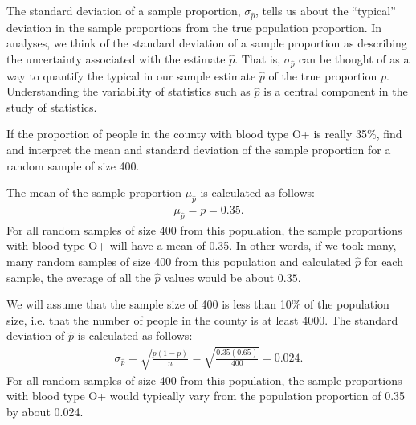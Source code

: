 The standard deviation of a sample proportion, $\sigma_{\hat{p}}$, tells us about the ``typical'' deviation in the sample proportions from the true population proportion.  In analyses, we think of the standard deviation of a sample proportion as describing the uncertainty associated with the estimate $\hat{p}$. That is, $\sigma_{\hat{p}}$ can be thought of as a way to quantify the typical  in our sample estimate $\hat{p}$ of the true proportion $p$. Understanding the variability of statistics such as $\hat{p}$ is a central component in the study of statistics.


\D{\newpage}

\begin{examplewrap}
\begin{nexample}{If the proportion of people in the county with blood type O+ is really 35\%, find and interpret the mean and standard deviation of the sample proportion for a random sample of size 400.}

The mean of the sample proportion $\mu_{\hat{p}}$ is calculated as follows:
\begin{align*}
\mu_{\hat{p}} = p = 0.35.
\end{align*}
For all random samples of size 400 from this population, the sample proportions with blood type O+ will have a mean of 0.35.  In other words, if we took many, many random samples of size 400 from this population and calculated $\hat{p}$ for each sample, the average of all the $\hat{p}$ values would be about $0.35$.  

We will assume that the sample size of 400 is less than 10\% of the population size, i.e. that the number of people in the county is at least 4000. The standard deviation of $\hat{p}$ is calculated as follows:
\begin{align*}
\sigma_{\hat{p}}
	= \sqrt{\frac{p(1-p)}{n}}
	= \sqrt{\frac{0.35(0.65)}{400}}
	= 0.024.
\end{align*}
For all random samples of size 400 from this population, the sample proportions with blood type O+ would typically vary from the population proportion of 0.35 by about 0.024. 
\end{nexample}
\end{examplewrap}

